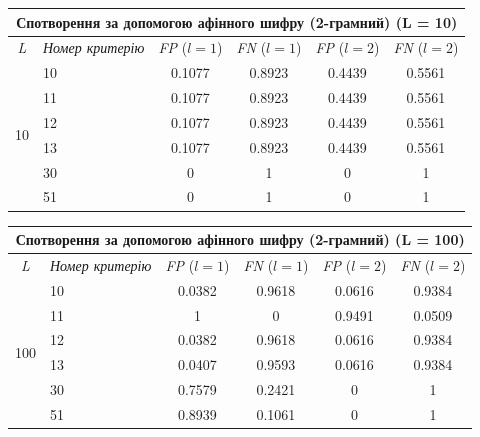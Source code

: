\documentclass[a4paper,12pt]{article}
\begin{document}
\begin{center}
\renewcommand{\arraystretch}{1.2}
\setlength{\tabcolsep}{6pt}
\begin{tabular}{|c|l||c|c||c|c|}
\hline
\multicolumn{6}{|c|}{Спотворення за допомогою афінного шифру (2-грамний) (L = 10)} \\
\hline
\textit{L} & \textit{Номер критерію} & \textit{FP} ($l=1$) & \textit{FN} ($l=1$) & \textit{FP} ($l=2$) & \textit{FN} ($l=2$) \\
\hline
\multirow{6}{*}{10} & 10 & 0.1077 & 0.8923 & 0.4439 & 0.5561 \\
 & 11 & 0.1077 & 0.8923 & 0.4439 & 0.5561 \\
 & 12 & 0.1077 & 0.8923 & 0.4439 & 0.5561 \\
 & 13 & 0.1077 & 0.8923 & 0.4439 & 0.5561 \\
 & 30 & 0 & 1 & 0 & 1 \\
 & 51 & 0 & 1 & 0 & 1 \\
\hline
\end{tabular}
\end{center}

\begin{center}
\renewcommand{\arraystretch}{1.2}
\setlength{\tabcolsep}{6pt}
\begin{tabular}{|c|l||c|c||c|c|}
\hline
\multicolumn{6}{|c|}{Спотворення за допомогою афінного шифру (2-грамний) (L = 100)} \\
\hline
\textit{L} & \textit{Номер критерію} & \textit{FP} ($l=1$) & \textit{FN} ($l=1$) & \textit{FP} ($l=2$) & \textit{FN} ($l=2$) \\
\hline
\multirow{6}{*}{100} & 10 & 0.0382 & 0.9618 & 0.0616 & 0.9384 \\
 & 11 & 1 & 0 & 0.9491 & 0.0509 \\
 & 12 & 0.0382 & 0.9618 & 0.0616 & 0.9384 \\
 & 13 & 0.0407 & 0.9593 & 0.0616 & 0.9384 \\
 & 30 & 0.7579 & 0.2421 & 0 & 1 \\
 & 51 & 0.8939 & 0.1061 & 0 & 1 \\
\hline
\end{tabular}
\end{center}
\end{document}
